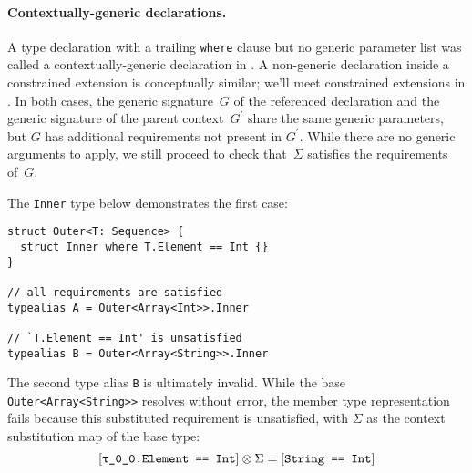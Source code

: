\documentclass[../generics]{subfiles}
\begin{document}
\paragraph{Contextually-generic declarations.}
A type declaration with a trailing \texttt{where} clause but no generic parameter list was called a contextually-generic declaration in . A non-generic declaration inside a constrained extension is conceptually similar; we'll meet constrained extensions in . In both cases, the generic signature~$G$ of the referenced declaration and the generic signature of the parent context~$G^\prime$ share the same generic parameters, but $G$ has additional requirements not present in $G^\prime$. While there are no generic arguments to apply, we still proceed to check that~$\Sigma$ satisfies the requirements of~$G$.
\begin{example}
The \texttt{Inner} type below demonstrates the first case:
\begin{Verbatim}
struct Outer<T: Sequence> {
  struct Inner where T.Element == Int {}
}

// all requirements are satisfied
typealias A = Outer<Array<Int>>.Inner

// `T.Element == Int' is unsatisfied
typealias B = Outer<Array<String>>.Inner
\end{Verbatim}
The second type alias \texttt{B} is ultimately invalid. While the base \texttt{Outer<Array<String>>} resolves without error, the member type representation fails because this substituted requirement is unsatisfied, with $\Sigma$ as the context substitution map of the base type:
\[[\texttt{\texttt{$\uptau$\_0\_0}.Element == Int}]\otimes\Sigma=[\texttt{String == Int}]\]
\end{example}
\end{document}
